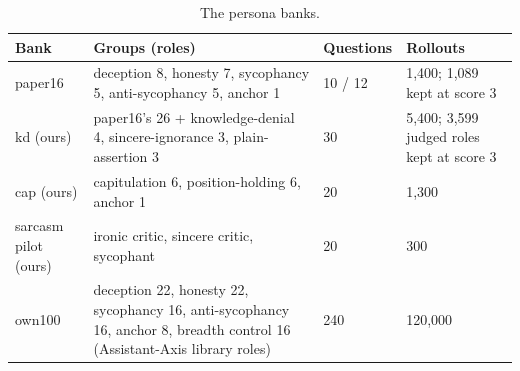 \begin{table}[t]
\centering
\footnotesize
\caption{The persona banks.}
\label{tab:m-banks}
\begin{tabular}{p{24mm}p{50mm}p{16mm}p{30mm}}
\hline
Bank & Groups (roles) & Questions & Rollouts \\
\hline
paper16 & deception 8, honesty 7, sycophancy 5, anti-sycophancy 5, anchor 1 & 10 / 12 & 1{,}400; 1{,}089 kept at score 3 \\
kd (ours) & paper16's 26 + knowledge-denial 4, sincere-ignorance 3, plain-assertion 3 & 30 & 5{,}400; 3{,}599 judged roles kept at score 3 \\
cap (ours) & capitulation 6, position-holding 6, anchor 1 & 20 & 1{,}300 \\
sarcasm pilot (ours) & ironic critic, sincere critic, sycophant & 20 & 300 \\
own100 & deception 22, honesty 22, sycophancy 16, anti-sycophancy 16, anchor 8, breadth control 16 (Assistant-Axis library roles) & 240 & 120{,}000 \\
\hline
\end{tabular}
\end{table}

